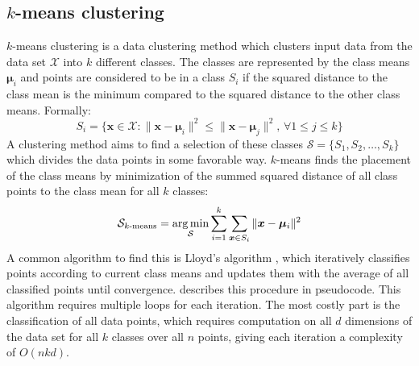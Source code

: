 
\newcommand{\dset}{\mathcal{X}}
\newcommand{\dpoint}{\bm{x}}
\newcommand{\mean}{\bm{\mu}}
\newcommand{\meann}{\bar{\bm{\mu}}}

\newcommand{\cls}{\text{class}}
\newcommand{\cnt}{\text{count}}

\subsection{$k$-means clustering}

$k$-means clustering is a data clustering method
which clusters input data from the data set $\dset$ into $k$ different classes.
The classes are represented by the class means $\mean_i$ and points are considered to be in a class $S_i$
if the squared distance to the class mean is the minimum
compared to the squared distance to the other class means.
Formally:
\[
      S_i = \{ \dpoint \in \dset
   :  \| \dpoint - \mean_i \|^2 \leq \| \dpoint - \mean_j \|^2
  ,\, \forall 1 \leq j \leq k \}
\]
A clustering method aims to find a selection of these classes
$\mathcal{S} = \{S_1, S_2, \ldots, S_k\}$
which divides the data points in some favorable way.
$k$-means finds the placement of the class means
by minimization of the summed squared distance of all class points to the class mean for all $k$ classes:
\[
  \mathcal{S}_{k\text{-means}}
  = \argmin_\mathcal{S} \sum_{i = 1}^k \sum_{\dpoint \in S_i} \| \dpoint - \mean_i \|^2
\]
A common algorithm to find this is Lloyd's algorithm \cite{lloyd},
which iteratively classifies points according to current class means
and updates them with the average of all classified points until convergence.
 describes this procedure in pseudocode.
This algorithm requires multiple loops for each iteration.
The most costly part is the classification of all data points,
which requires computation on all $d$ dimensions of the data set
for all $k$ classes over all $n$ points,
giving each iteration a complexity of $O(nkd)$.

